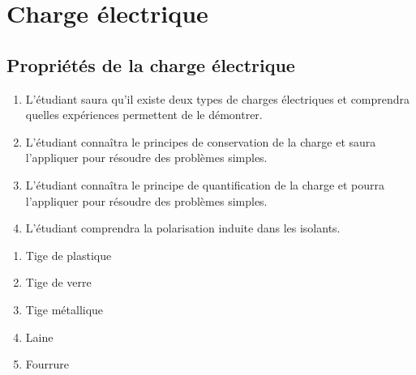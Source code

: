 \chapter{Charge électrique}

\section{Propriétés de la charge électrique}



\begin{enumerate}
  \item L'étudiant saura qu'il existe deux types de charges électriques et
    comprendra quelles expériences permettent de le démontrer.
  \item L'étudiant connaîtra le principes de conservation de la charge et saura
    l'appliquer pour résoudre des problèmes simples.
  \item L'étudiant connaîtra le principe de quantification de la charge et
    pourra l'appliquer pour résoudre des problèmes simples.
  \item L'étudiant comprendra la polarisation induite dans les isolants.
\end{enumerate}



\begin{enumerate}
  \item Tige de plastique
  \item Tige de verre
  \item Tige métallique
  \item Laine
  \item Fourrure
\end{enumerate}



